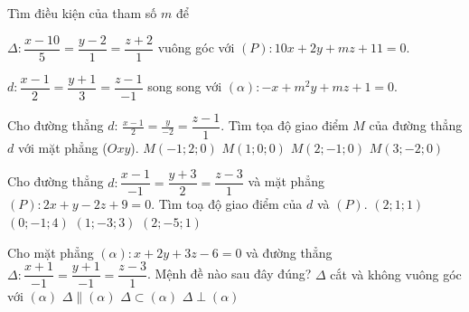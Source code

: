 \begin{vd}
	Tìm điều kiện của tham số $m$ để
	\begin{enumEX}[a)]{1}
		\item $ \Delta:\dfrac{x-10}{5}=\dfrac{y-2}{1}=\dfrac{z+2}{1}$ vuông góc với $(P):10x+2y+mz+11=0$.
		\item $d\colon \dfrac{x-1}{2}=\dfrac{y+1}{3}=\dfrac{z-1}{-1}$ song song với $(\alpha)\colon -x+m^2y+mz+1=0$.
	\end{enumEX}
\end{vd}
\setcounter{ex}{0}
\begin{ex}
	Cho đường thẳng $d:\,\displaystyle\frac{x-1}{2}=\frac{y}{-2}=\dfrac{z-1}{1}$. Tìm tọa độ giao điểm $ M $ của đường thẳng $ d $ với mặt phẳng ($ Oxy $).
	\choice
	{\True$M(-1;2;0) $}
	{$ M(1;0;0)$}
	{$ M(2;-1;0)$}
	{$ M(3;-2;0)$}
	\loigiai{
	}
\end{ex}

\begin{ex}
	Cho đường thẳng $d: \dfrac{x-1}{-1}=\dfrac{y+3}{2}=\dfrac{z-3}{1}$ và mặt phẳng $(P): 2x+y-2z+9=0$. Tìm toạ độ giao điểm của $d$ và $(P)$.
	\choice
	{$(2; 1; 1)$}
	{\True $(0;-1;4)$}
	{$(1; -3; 3)$}
	{$(2; -5; 1)$} 
	\loigiai{
	}
\end{ex}
\begin{ex}
	Cho mặt phẳng $(\alpha)\colon x+2y+3z-6=0$ và đường thẳng $\Delta\colon\dfrac{x+1}{-1}=\dfrac{y+1}{-1}=\dfrac{z-3}{1}$. Mệnh đề nào sau đây đúng?
	\choice
	{$\Delta$ cắt và không vuông góc với $(\alpha)$}
	{$\Delta\parallel (\alpha)$}
	{\True $\Delta\subset (\alpha)$}
	{$\Delta \perp (\alpha)$}
\end{ex}

